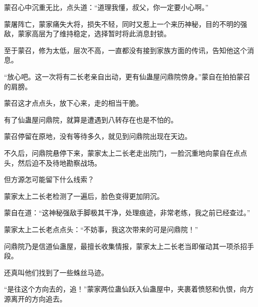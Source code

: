\begin{this_body}
蒙召心中沉重无比，点头道：“道理我懂，叔父，你一定要小心啊。”

蒙屠阵亡，蒙家痛失大将，损失不轻，同时又惹上一个来历神秘，目的不明的强敌，蒙家高层为了维持稳定，选择暂时将此消息封锁。

至于蒙召，修为太低，层次不高，一直都没有接到家族方面的传讯，告知他这个消息。

“放心吧。这一次将有二长老亲自出动，更有仙蛊屋问鼎院傍身。”蒙自在拍拍蒙召的肩膀。

蒙召这才点点头，放下心来，走的相当干脆。

有了仙蛊屋问鼎院，就算是遭遇到八转存在也是不怕的。

蒙召停留在原地，没有等待多久，就见到问鼎院出现在天边。

不久后，问鼎院悬停下来，蒙家太上二长老走出院门，一脸沉重地向蒙自在点点头，然后迫不及待地勘察战场。

但方源怎可能留下什么线索？

蒙家太上二长老检测了一遍后，脸色变得更加阴沉。

蒙自在道：“这神秘强敌手脚极其干净，处理痕迹，非常老练，我之前已经查过。”

蒙家太上二长老点点头：“不妨事，我这次带来的可是问鼎院！”

问鼎院乃是信道仙蛊屋，最擅长收集情报，蒙家太上二长老当即催动其一项杀招手段。

还真叫他们找到了一些蛛丝马迹。

“是往这个方向去的，追！”蒙家两位蛊仙跃入仙蛊屋中，夹裹着愤怒和仇恨，向方源离开的方向追去。

\end{this_body}


